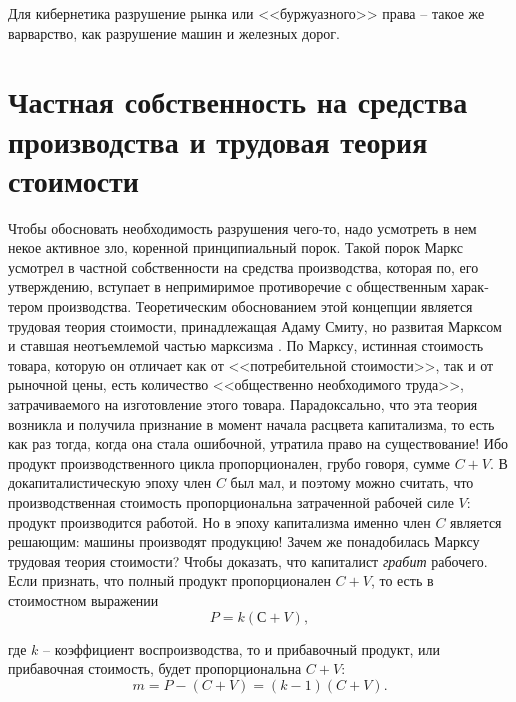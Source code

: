 \documentclass{book}
\begin{document}
Для кибернетика раз­рушение рынка или <<буржуазного>> права -- такое же варварст­во, 
как разрушение машин и железных дорог.



\section{Частная собственность на средства производства и трудовая теория стоимости}

Чтобы обосновать необходимость разрушения чего-то, надо усмотреть в нем некое активное зло, коренной принципиаль­ный порок. Такой порок Маркс усмотрел в частной собствен­ности на средства производства, которая по, его утверждению, вступает в непримиримое противоречие с общественным харак­тером производства. Теоретическим обоснованием этой кон­цепции является трудовая теория стоимости, принадлежащая Адаму Смиту, но развитая Марксом и ставшая неотъемлемой частью марксизма . По Марксу, истинная стоимость товара, которую он отличает как от <<потребительной стоимости>>, так и от рыночной цены, есть количество <<общественно необходи­мого труда>>, затрачиваемого на изготовление этого товара. Парадоксально, что эта теория возникла и получила призна­ние в момент начала расцвета капитализма, то есть как раз тогда, когда она стала ошибочной, утратила право на сущест­вование! Ибо продукт производственного цикла пропорционален, грубо говоря, сумме $C + V$. В докапиталистическую эпоху член $C$ был мал, и поэтому можно считать, что произ­водственная стоимость пропорциональна затраченной рабочей силе $V$: продукт производится работой. Но в эпоху капитализ­ма именно член $C$ является решающим: машины производят продукцию! Зачем же понадобилась Марксу трудовая теория стоимости? Чтобы доказать, что капиталист \textit{грабит}  рабочего. Если признать, что полный продукт пропорционален $C + V$, то есть в стоимостном выражении
\[
	P = k(С + V),
\]

где $k$ -- коэффициент воспроизводства, то и прибавочный продукт, или прибавочная стоимость, будет пропорциональ­на $C + V$:
\[
	m=P-(C+V)=(k-1)(C+V).
\]
\end{document}
